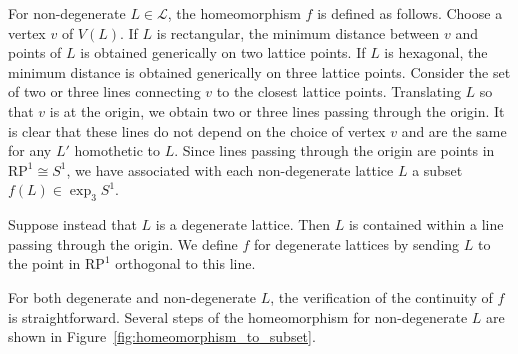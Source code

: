\documentclass[12pt,twoside]{reedthesis}
\theoremstyle{definition}
\newcommand{\LS}{\mathcal{L}}
\newcommand{\RP}{\mathrm{RP}^1}
\begin{document}
For non-degenerate $L \in \LS$, the homeomorphism $f$ is defined as follows.
Choose a vertex $v$ of $V(L)$.
If $L$ is rectangular, the minimum distance between $v$ and points of $L$ is obtained generically on two lattice points.
If $L$ is hexagonal, the minimum distance is obtained generically on three lattice points.
Consider the set of two or three lines connecting $v$ to the closest lattice points.
Translating $L$ so that $v$ is at the origin, we obtain two or three lines passing through the origin.
It is clear that these lines do not depend on the choice of vertex $v$ and are the same for any $L'$ homothetic to $L$.
Since lines passing through the origin are points in $\RP \cong S^1$, we have associated with each non-degenerate lattice $L$ a subset $f(L) \in \exp_3 S^1$.

Suppose instead that $L$ is a degenerate lattice.
Then $L$ is contained within a line passing through the origin.
We define $f$ for degenerate lattices by sending $L$ to the point in $\mathrm{RP}^1$ orthogonal to this line.

For both degenerate and non-degenerate $L$, the verification of the continuity of $f$ is straightforward.
Several steps of the homeomorphism for non-degenerate $L$ are shown in Figure~\ref{fig:homeomorphism_to_subset}.
\end{document}
